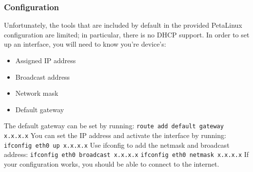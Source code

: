 \documentclass[12pt]{report}
\begin{document}
\subsubsection{Configuration}
Unfortunately, the tools that are included by default in the provided PetaLinux configuration are limited; in particular, there is no DHCP support. In order to set up an interface, you will need to know you're device's:
\begin{itemize}
\item Assigned IP address
\item Broadcast address
\item Network mask
\item Default gateway
\end{itemize}
The default gateway can be set by running:
\newline \texttt{route add default gateway x.x.x.x}
\newline You can set the IP address and activate the interface by running:
\newline \texttt{ifconfig eth0 up x.x.x.x}
\newline Use ifconfig to add the netmask and broadcast address:
\newline \texttt{ifconfig eth0 broadcast x.x.x.x}
\newline \texttt{ifconfig eth0 netmask x.x.x.x}
\newline If your configuration works, you should be able to connect to the internet. 
\end{document}

